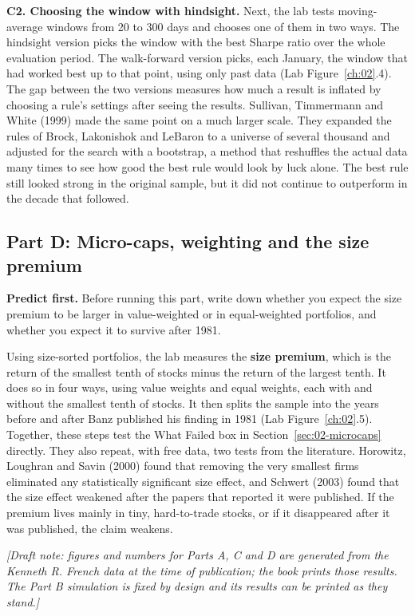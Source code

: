 \textbf{C2. Choosing the window with hindsight.} Next, the lab tests moving-average windows from 20 to 300 days and chooses one of them in two ways. The hindsight version picks the window with the best Sharpe ratio over the whole evaluation period. The walk-forward version picks, each January, the window that had worked best up to that point, using only past data (Lab Figure~\ref{ch:02}.4). The gap between the two versions measures how much a result is inflated by choosing a rule's settings after seeing the results. Sullivan, Timmermann and White (1999) made the same point on a much larger scale. They expanded the rules of Brock, Lakonishok and LeBaron to a universe of several thousand and adjusted for the search with a bootstrap, a method that reshuffles the actual data many times to see how good the best rule would look by luck alone. The best rule still looked strong in the original sample, but it did not continue to outperform in the decade that followed.

\subsection*{Part D: Micro-caps, weighting and the size premium}

\textbf{Predict first.} Before running this part, write down whether you expect the size premium to be larger in value-weighted or in equal-weighted portfolios, and whether you expect it to survive after 1981.

Using size-sorted portfolios, the lab measures the \textbf{size premium}, which is the return of the smallest tenth of stocks minus the return of the largest tenth. It does so in four ways, using value weights and equal weights, each with and without the smallest tenth of stocks. It then splits the sample into the years before and after Banz published his finding in 1981 (Lab Figure~\ref{ch:02}.5). Together, these steps test the What Failed box in Section~\ref{sec:02-microcaps} directly. They also repeat, with free data, two tests from the literature. Horowitz, Loughran and Savin (2000) found that removing the very smallest firms eliminated any statistically significant size effect, and Schwert (2003) found that the size effect weakened after the papers that reported it were published. If the premium lives mainly in tiny, hard-to-trade stocks, or if it disappeared after it was published, the claim weakens.

\emph{[Draft note: figures and numbers for Parts A, C and D are generated from the Kenneth R. French data at the time of publication; the book prints those results. The Part B simulation is fixed by design and its results can be printed as they stand.]}

